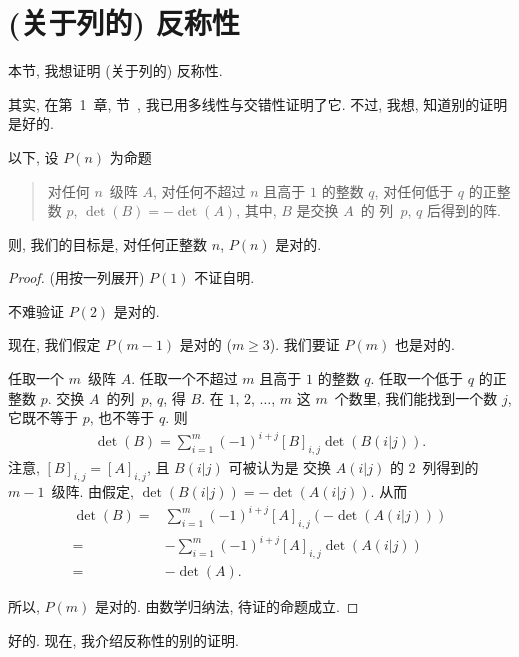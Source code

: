 \documentclass[../libro.tex]{subfiles}
\begin{document}
\section{(关于列的) 反称性}

本节, 我想证明 (关于列的) 反称性.

其实, 在第~1~章, 节~,
我已用多线性与交错性证明了它.
不过, 我想, 知道别的证明是好的.

以下, 设 \(P(n)\) 为命题
\begin{quotation}
    对任何 \(n\)~级阵 \(A\),
    对任何不超过 \(n\) 且高于 \(1\) 的整数 \(q\),
    对任何低于 \(q\) 的正整数 \(p\),
    \(\det {(B)} = -\det {(A)}\),
    其中, \(B\) 是交换 \(A\)~的%
    列~\(p\), \(q\) 后得到的阵.
\end{quotation}
则, 我们的目标是,
对任何正整数 \(n\), \(P(n)\) 是对的.

\begin{proof}
    (用按一列展开)
    \(P(1)\) 不证自明.

    不难验证 \(P(2)\) 是对的.

    现在, 我们假定 \(P(m-1)\) 是对的 (\(m \geq 3\)).
    我们要证 \(P(m)\) 也是对的.

    任取一个 \(m\)~级阵 \(A\).
    任取一个不超过 \(m\) 且高于 \(1\) 的整数 \(q\).
    任取一个低于 \(q\) 的正整数 \(p\).
    交换 \(A\)~的列~\(p\), \(q\), 得 \(B\).
    在 \(1\), \(2\), \(\dots\), \(m\) 这 \(m\)~个数里,
    我们能找到一个数 \(j\),
    它既不等于 \(p\), 也不等于 \(q\).
    则
    \begin{align*}
        \det {(B)}
        = \sum_{i = 1}^{m}
        {(-1)^{i + j} [B]_{i,j} \det {(B(i|j))}}.
    \end{align*}
    注意, \([B]_{i,j} = [A]_{i,j}\),
    且 \(B(i|j)\) 可被认为是%
    交换 \(A(i|j)\) 的 \(2\)~列得到的 \(m-1\)~级阵.
    由假定, \(\det {(B(i|j))} = -\det {(A(i|j))}\).
    从而
    \begin{align*}
        \det {(B)}
        = {} &
        \sum_{i = 1}^{m}
        {(-1)^{i + j} [A]_{i,j} (-\det {(A(i|j))})}
        \\
        = {} &
        {-} \sum_{i = 1}^{m}
        {(-1)^{i + j} [A]_{i,j} \det {(A(i|j))}}
        \\
        = {} &
        {-} \det {(A)}.
    \end{align*}

    所以, \(P(m)\) 是对的.
    由数学归纳法, 待证的命题成立.
\end{proof}

好的.
现在, 我介绍反称性的别的证明.
\end{document}
